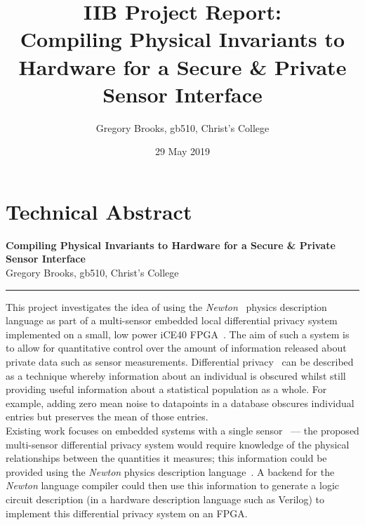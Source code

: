 \documentclass[12pt]{article}
\begin{document}

\clearpage \mbox{}
\clearpage
{}

\noindent

%
%

\title
{
  IIB Project Report:\\
  Compiling Physical Invariants to Hardware for a Secure \& Private Sensor Interface\\
}
\author{Gregory Brooks, gb510, Christ's College}
\date{29 May 2019}
\maketitle

\tableofcontents

\clearpage
{}

%
%
\pagestyle{technical_abstract}
\section{Technical Abstract}

\begin{center}
{
  \bf Compiling Physical Invariants to Hardware for a Secure \& Private Sensor Interface\\
}
Gregory Brooks, gb510, Christ's College
\end{center}
\rule{15.7cm}{0.5mm}
\vspace{1cm}

This project investigates the idea of using the \textit{Newton}~\cite{Newton} physics description language as part of a multi-sensor embedded local differential privacy system implemented on a small, low power iCE40 FPGA~\cite{iCE40}. The aim of such a system is to allow for quantitative control over the amount of information released about private data such as sensor measurements. Differential privacy~\cite{dwork2010differential} can be described as a technique whereby information about an individual is obscured whilst still providing useful information about a statistical population as a whole. For example, adding zero mean noise to datapoints in a database obscures individual entries but preserves the mean of those entries.\\

Existing work focuses on embedded systems with a single sensor~\cite{Choi2018GuaranteeingLD} --- the proposed multi-sensor differential privacy system would require knowledge of the physical relationships between the quantities it measures; this information could be provided using the \textit{Newton} physics description language~\cite{Newton}. A backend for the \textit{Newton} language compiler could then use this information to generate a logic circuit description (in a hardware description language such as Verilog) to implement this differential privacy system on an FPGA.\\
\end{document}
